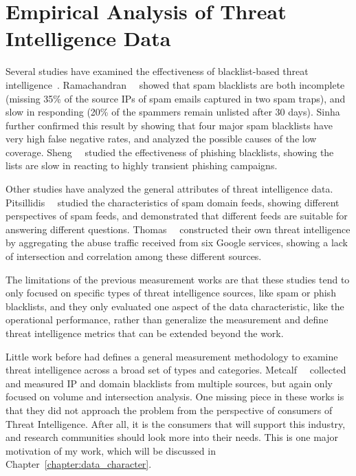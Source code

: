 \section{Empirical Analysis of Threat Intelligence Data}

Several studies have examined the effectiveness of blacklist-based 
threat intelligence~\cite{kuhrer2014paint, ramachandran2006revealing, 
ramachandran2007filtering, sheng2009empirical, sinha2008shades}.
Ramachandran~\etal~\cite{ramachandran2007filtering} showed that spam 
blacklists are both incomplete (missing 35\% of the source IPs of 
spam emails captured in two spam traps), and slow in responding 
(20\% of the spammers remain unlisted after 30 days).
Sinha~\etal~\cite{sinha2008shades} further confirmed this result by 
showing that four major spam blacklists have very high false negative
rates, and analyzed the possible causes of the low coverage.
Sheng~\etal~\cite{sheng2009empirical} studied the effectiveness of
phishing blacklists, showing the lists are slow in reacting to
highly transient phishing campaigns.

Other studies have analyzed the general attributes of threat
intelligence data. Pitsillidis~\etal~\cite{tasters:imc12} studied the
characteristics of spam domain feeds, showing different perspectives
of spam feeds, and demonstrated that different feeds are suitable for
answering different questions. Thomas~\etal~\cite{thomas2016abuse}
constructed their own threat intelligence by aggregating the abuse
traffic received from six Google services, showing a lack of
intersection and correlation among these different sources. 

The limitations of the previous measurement works are that these 
studies tend to only focused on specific types of threat intelligence 
sources, like spam or phish blacklists, and they only evaluated one 
aspect of the data characteristic, like the operational performance, 
rather than generalize the measurement and define threat intelligence 
metrics that can be extended beyond the work.

Little work before had defines a general measurement methodology to
examine threat intelligence across a broad set of types and categories.
Metcalf~\etal~\cite{metcalf2015blacklist} collected and measured IP
and domain blacklists from multiple sources, but again only focused 
on volume and intersection analysis. One missing piece in these works
is that they did not approach the problem from the perspective of 
consumers of Threat Intelligence.  After all, it is the consumers that
will support this industry, and research communities should look more
into their needs. This is one major motivation of my work, which will
be discussed in Chapter~\ref{chapter:data_character}.